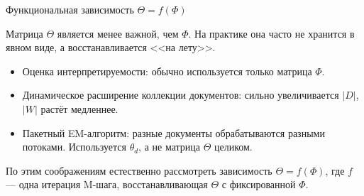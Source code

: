 \begin{frame}{Функциональная зависимость $\Theta = f(\Phi)$}

Матрица $\Theta$ является менее важной, чем $\Phi$. На практике она часто не хранится в явном виде, а восстанавливается <<на лету>>.

\begin{itemize}
\item Оценка интерпретируемости: обычно используется только матрица $\Phi$.

\item Динамическое расширение коллекции документов: сильно увеличивается $|D|$, $|W|$ растёт медленнее.

\item Пакетный EM-алгоритм: разные документы обрабатываются разными потоками. Используется $\theta_d$, а не матрица $\Theta$ целиком.
\end{itemize}

\bigskip
По этим соображениям естественно рассмотреть зависимость $\Theta = f(\Phi)$, где $f$ --- одна итерация M-шага, восстанавливающая $\Theta$ с фиксированной $\Phi$.

\end{frame}

